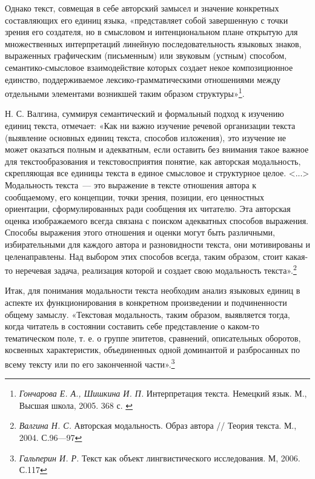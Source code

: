 \documentclass{kursa4}
\begin{document}
      Однако текст, совмещая в себе авторский замысел и значение
      конкретных составляющих его единиц языка, «представляет собой
      завершенную с точки зрения его создателя, но в смысловом и
      интенциональном плане открытую для множественных интерпретаций линейную
      последовательность языковых знаков, выраженных графическим (письменным)
      или звуковым (устным) способом, семантико-смысловое взаимодействие
      которых создает некое композиционное единство, поддерживаемое
      лексико-грамматическими отношениями между отдельными элементами
      возникшей таким образом
      структуры»\footnote{\textit{{Гончарова Е. А., Шишкина
      И. П. }}{Интерпретация текста. Немецкий язык. М.,
      Высшая школа, 2005. 368 с. }}.

      Н. С. Валгина, суммируя семантический и формальный подход к изучению
      единиц текста, отмечает: «Как ни важно изучение речевой организации
      текста (выявление основных единиц текста, способов изложения), это
      изучение не может оказаться полным и адекватным, если оставить без
      внимания такое важное для текстообразования и текстовосприятия понятие,
      как авторская модальность, скрепляющая все единицы текста в единое
      смысловое и структурное целое. \textless{}...\textgreater{} Модальность
      текста~--- это выражение в тексте отношения автора к сообщаемому, его
      концепции, точки зрения, позиции, его ценностных ориентации,
      сформулированных ради сообщения их читателю. Эта авторская оценка
      изображаемого всегда связана с поиском адекватных способов выражения.
      Способы выражения этого отношения и оценки могут быть различными,
      избирательными для каждого автора и разновидности текста, они
      мотивированы и целенаправлены. Над выбором этих способов всегда, таким
      образом, стоит какая-то неречевая задача, реализация которой и создает
      свою модальность текста».\footnote{\textit{{Валгина Н.
      С. }}{Авторская модальность. Образ автора // Теория
      текста. М., 2004. С.96—97}} 

      Итак, для понимания модальности текста необходим анализ языковых
      единиц в аспекте их функционирования в конкретном произведении и
      подчиненности общему замыслу. «{Текстовая модальность,
      таким образом, выявляется тогда, когда читатель в состоянии составить
      себе представление о каком-то тематическом поле, т. е. о группе
      эпитетов, сравнений, описательных оборотов, косвенных характеристик,
      объединенных одной доминантой и разбросанных по всему тексту или по его
      законченной части».}\footnote{\textit{{Гальперин И. Р.
      }}{Текст как объект лингвистического исследования. М,
      2006. С.117}}{ }
\end{document}
